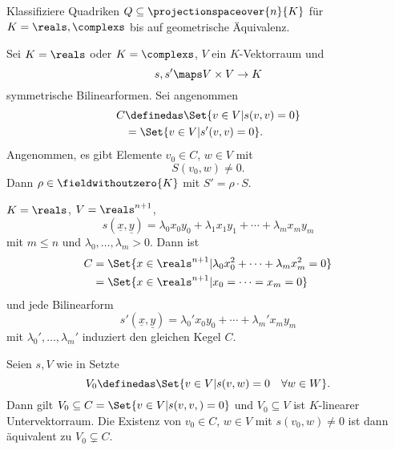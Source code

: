 \begin{ziel}
  Klassifiziere Quadriken \( Q\subseteq \projectionspaceover{n}{K} \) für \( K=\reals,\complexs \) bis auf geometrische Äquivalenz.
\end{ziel}
\begin{lemma}\label{gleicher_kegel_bilinearformen_vielfache_kriterium}
  Sei \( K=\reals \) oder \( K=\complexs \), \( V \) ein \( K \)-Vektorraum und
  \begin{equation*}
    s,s'\maps V\times V\to K
  \end{equation*}
  symmetrische Bilinearformen. Sei angenommen
  \begin{align*}
    C&\definedas \Set{v\in V|s(v,v)=0}\\
    &=\Set{v\in V|s'(v,v)=0}.
  \end{align*}
  Angenommen, es gibt Elemente \( v_0\in C \), \( w\in V \) mit
  \begin{equation*}
    S(v_0,w)\neq 0.
  \end{equation*}
  Dann \texists  \( \rho\in \fieldwithoutzero{K} \) mit \( S'=\rho\cdot S \).
\end{lemma} 
\begin{beispiel*}
  \( K=\reals \), \( V=\reals^{n+1} \),
  \begin{equation*}
    s(\underline{x},\underline{y})=\lambda_0 x_0 y_0+\lambda_1 x_1 y_1+\dotsb+\lambda_m x_m y_m
  \end{equation*}
  mit \( m\leq n \) und \( \lambda_0,\dotsc,\lambda_m>0 \). Dann ist 
  \begin{align*}
    C&=\Set{x\in \reals^{n+1}|\lambda_0 x_0^2+\dotsb+\lambda_m x_m^2=0}\\
    &=\Set{x\in \reals^{n+1}|x_0=\dotsb=x_m=0}
  \end{align*}
  und jede Bilinearform
  \begin{equation*}
    s'(\underline{x},\underline{y})=\lambda_0' x_0 y_0+\dotsb+\lambda_m' x_m y_m
  \end{equation*}
  mit \( \lambda_0', \dotsc, \lambda_m' \) induziert den gleichen Kegel \( C \).
\end{beispiel*}
\begin{bemerkung*}
  Seien \( s,V \) wie in  Setzte
  \begin{equation*}
    V_0\definedas \Set{v\in V| s(v,w)=0\quad \forall w\in W}.
  \end{equation*}
  Dann gilt \( V_0\subseteq C=\Set{v\in V|s(v,v,)=0} \) und \( V_0\subseteq V \) ist \( K \)-linearer Untervektorraum. Die Existenz von \( v_0\in C \), \( w\in V \) mit \( s(v_0,w)\neq 0 \) ist dann äquivalent zu \( V_0\subsetneq C \).
\end{bemerkung*}
